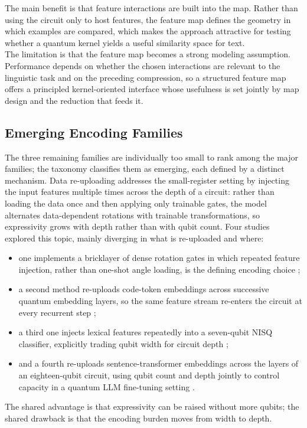 \documentclass{ieeeaccess}
\begin{document}
The main benefit is that feature interactions are built into the map. Rather than using the circuit only to host features, the feature map defines the geometry in which examples are compared, which makes the approach attractive for testing whether a quantum kernel yields a useful similarity space for text.\\
The limitation is that the feature map becomes a strong modeling assumption. Performance depends on whether the chosen interactions are relevant to the linguistic task and on the preceding compression, so a structured feature map offers a principled kernel-oriented interface whose usefulness is set jointly by map design and the reduction that feeds it.

\subsection{Emerging Encoding Families}
\label{subsec:other_encoding_interfaces}

The three remaining families are individually too small to rank among the major families; the taxonomy classifies them as emerging, each defined by a distinct mechanism. Data re-uploading addresses the small-register setting by injecting the input features multiple times across the depth of a circuit: rather than loading the data once and then applying only trainable gates, the model alternates data-dependent rotations with trainable transformations, so expressivity grows with depth rather than with qubit count. 
Four studies explored this topic, mainly diverging 
in what is re-uploaded and where: 
\begin{itemize}
    \item one implements a bricklayer of dense rotation gates in which repeated feature injection, rather than one-shot angle loading, is the defining encoding choice \cite{hamilton_characterizing_2023}; 
    \item a second method 
    re-uploads code-token embeddings across successive quantum embedding layers, so the same feature stream re-enters the circuit at every recurrent step \cite{song_recurrent_2024};
    \item a third one injects lexical features repeatedly into a seven-qubit NISQ classifier, explicitly trading qubit width for circuit depth \cite{silver_lexiql_2024};
    \item and a fourth re-uploads sentence-transformer embeddings across the layers of an eighteen-qubit circuit, using qubit count and depth jointly to control capacity in a quantum LLM fine-tuning setting \cite{kim_quantum_2025}.  
\end{itemize}
    The shared advantage is that expressivity can be raised without more qubits; the shared drawback is that the encoding burden moves from width to depth.
\end{document}
